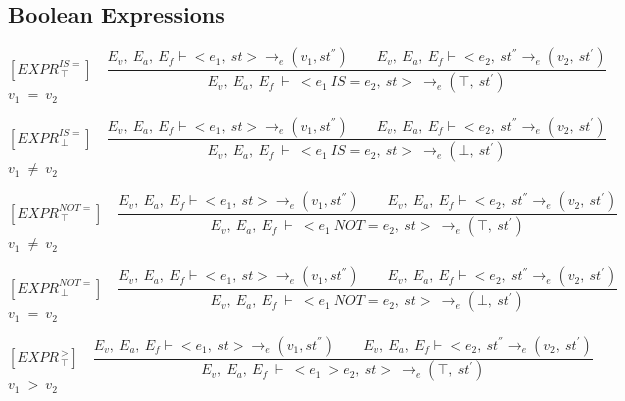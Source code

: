   	\subsection{Boolean Expressions}
   	\[
   	[EXPR^{IS=}_{\ \top}] \quad
   	\dfrac{E_v, \ E_a, \ E_f \vdash <e_1, \ st> \rightarrow_e (v_1, st^{''}) \qquad E_v, \ E_a, \ E_f \vdash <e_2, \ st^{''} \rightarrow_e (v_2, \ st^{'})}{E_v, \ E_a, \ E_f \ \vdash \ <e_1
   	\ IS= e_2, \ st> \ \rightarrow_e (\top, \ st^{'})}
   	\]
   	\begin{math}
   	v_1 \ = \ v_2 
   	\end{math}

   	\[
   	[EXPR^{IS=}_{\ \bot}] \quad
   	\dfrac{E_v, \ E_a, \ E_f \vdash <e_1, \ st> \rightarrow_e (v_1, st^{''}) \qquad E_v, \ E_a, \ E_f \vdash <e_2, \ st^{''} \rightarrow_e (v_2, \ st^{'})}{E_v, \ E_a, \ E_f \ \vdash \ <e_1
   	\ IS= e_2, \ st> \ \rightarrow_e (\bot, \ st^{'})}
   	\]
	\begin{math}
   	v_1 \ \not= \ v_2
   	\end{math}


   	\[
   	[EXPR^{NOT=}_{\ \top}] \quad
   	\dfrac{E_v, \ E_a, \ E_f \vdash <e_1, \ st> \rightarrow_e (v_1, st^{''}) \qquad E_v, \ E_a, \ E_f \vdash <e_2, \ st^{''} \rightarrow_e (v_2, \ st^{'})}{E_v, \ E_a, \ E_f \ \vdash \ <e_1 \ NOT= e_2, \ st> \ \rightarrow_e (\top, \ st^{'})}
   	\]
	\begin{math}
   	v_1 \ \not= \ v_2
   	\end{math}   	
   	

   	\[
   	[EXPR^{NOT=}_{\ \bot}] \quad
   	\dfrac{E_v, \ E_a, \ E_f \vdash <e_1, \ st> \rightarrow_e (v_1, st^{''}) \qquad E_v, \ E_a, \ E_f \vdash <e_2, \ st^{''} \rightarrow_e (v_2, \ st^{'})}{E_v, \ E_a, \ E_f \ \vdash \ <e_1 \ NOT= e_2, \ st> \ \rightarrow_e (\bot, \ st^{'})}
   	\]
	\begin{math}
   	v_1 \ = \ v_2
   	\end{math}   	
   	
   	
   	\[
   	[EXPR^{\ >}_{\ \top}] \quad
   	\dfrac{E_v, \ E_a, \ E_f \vdash <e_1, \ st> \rightarrow_e (v_1, st^{''}) \qquad E_v, \ E_a, \ E_f \vdash <e_2, \ st^{''} \rightarrow_e (v_2, \ st^{'})}{E_v, \ E_a, \ E_f \ \vdash \ <e_1 \ > e_2, \ st> \ \rightarrow_e (\top, \ st^{'})}
   	\]
	\begin{math}
   	v_1 \ > \ v_2
   	\end{math}   	
   	
   	\newcommand{\exprtrans}[5][E_v, E_a,E_f]{#1\vdash \langle #2, #3 \rangle \mathrel{\to_e} (#4 , #5)}
   	

